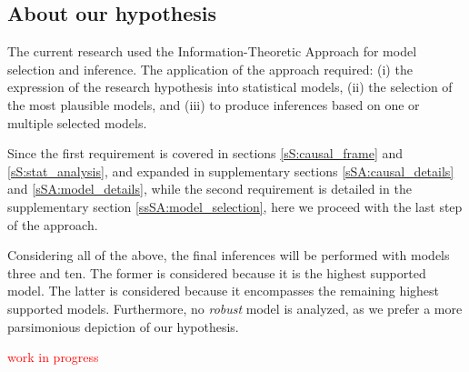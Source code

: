 \subsection{About our hypothesis} \label{sS:results_hypothesis}
%
The current research used the Information-Theoretic Approach \citep{Anderson_2008, Chamberlain_1965} for model selection and inference. The application of the approach required: (i) the expression of the research hypothesis into statistical models, (ii) the selection of the most plausible models, and (iii) to produce inferences based on one or multiple selected models.

Since the first requirement is covered in sections \ref{sS:causal_frame} and \ref{sS:stat_analysis}, and expanded in supplementary sections \ref{sSA:causal_details} and \ref{sSA:model_details}, while the second requirement is detailed in the supplementary section \ref{ssSA:model_selection}, here we proceed with the last step of the approach. 

Considering all of the above, the final inferences will be performed with models three and ten. The former is considered because it is the highest supported model. The latter is considered because it encompasses the remaining highest supported models. Furthermore, no \textit{robust} model is analyzed, as we prefer a more parsimonious depiction of our hypothesis.

\textcolor{red}{work in progress}

\begin{comment}
“simplest” model (E_NC2b) provides
(preliminar) evidence on,
the higher the unaided PTA the
lower the child’s SI (bP[2])
(based on power analysis, we can be
sure is a small effect)
no apparent statistical difference
between NH and HI=CI children
(but this requires a CONTRAST)
for each “hearing” year, the SI
increases in approx 0:40 logits
(effect larger than the assumed in
power analysis)


however, the “interaction” model
(E_NC5b3) shows similar results on,
the small (still non-significant)
effects of the unaided PTA on the
child’s SI
similar explained variability across
levels and blocks
(similar to the “simplest” model)
but “mild” evidence of prevalent
interactions,
SI means for HI=CI per E,
aEHS[2; 2] (Genetic) vs
aEHS[3; 2] (CMV)
different SI evolution for NH vs
HI=CI children, per unit A
(bAHS),

within the “interaction” model,
the size of the data within groups
from combinations of E and HS,
does not allow to reject the
contrasts’ null hypothesis,
similar result is observed on the
bAHS contrast
(because the effect is small, compared
to children’s variability)
but we still observe differences
between NH and HI/CI, and even
within HI/CI by E,
therefore we decide to keep the
(E_NC5b3) model
\end{comment}

